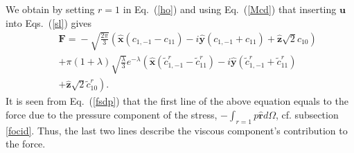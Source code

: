 \documentclass[aps,prx,twocolumn,amsmath,amssymb,amsfonts]{revtex4-2}
\begin{document}
{{\begin{appendices}
We obtain by setting $r=1$ in Eq.~(\ref{ho}) and using Eq.~(\ref{Mcd}) that inserting $\bm u$ into Eqs.~(\ref{sl}) gives
\begin{eqnarray}&&
\bm F\!=\!-\sqrt{\frac{2\pi}{3}} \left(\bm{\hat x}(c_{1, -1}\!-\!c_{11})\!-\! i\bm{\hat y}(c_{1, -1}\!+\!c_{11})\!+\!\bm{\hat z}\sqrt{2}c_{10}\right)
\nonumber\\&&
+\pi (1\!+\!\lambda) \sqrt{\frac{\lambda}{3}}e^{-\lambda}
 \left(\bm{\hat x}({\tilde c}^{r}_{1, -1}\!-\!{\tilde c}^{r}_{11})\!-\! i\bm{\hat y}({\tilde c}^{r}_{1, -1}\!+\!{\tilde c}^{r}_{11})
 \right.\nonumber\\&&\left.
 +\bm{\hat z}\sqrt{2}{\tilde c}^{r}_{10}\right). \label{fso}
\end{eqnarray}
It is seen from Eq.~(\ref{fsdp}) that the first line of the above equation equals to the force due to the pressure component of the stress, $-\int_{r=1} p\bm{\hat r} d\Omega$, cf. subsection \ref{focid}. Thus, the last two lines describe the viscous component's contribution to the force.


\end{appendices}}}
\end{document}
